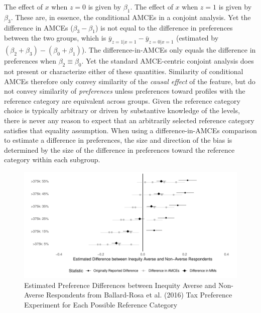 \documentclass[a4paper,12pt]{article}\usepackage[]{graphicx}\usepackage[]{color}
\makeatletter
\def\maxwidth{ %
  \ifdim\Gin@nat@width>\linewidth
    \linewidth
  \else
    \Gin@nat@width
  \fi
}
\newenvironment{knitrout}{}{} %
\makeatother
\begin{document}
\noindent The effect of $x$ when $z=0$ is given by $\beta_1$. The effect of $x$ when $z=1$ is given by $\beta_3$. These are, in essence, the conditional AMCEs in a conjoint analysis. Yet the difference in AMCEs ($\beta_3 - \beta_1$) is not equal to the difference in preferences between the two groups, which is $\bar{y}_{z=1|x=1} - \bar{y}_{z=0|x=1}$ (estimated by $(\beta_2 + \beta_3) - (\beta_0 + \beta_1)$). The difference-in-AMCEs only equals the difference in preferences when $\beta_2 \equiv \beta_0$. Yet the standard AMCE-centric conjoint analysis does not present or characterize either of these quantities. Similarity of conditional AMCEs therefore only convey similarity of the \textit{causal effect} of the feature, but do not convey similarity of \textit{preferences} unless preferences toward profiles with the reference category are equivalent across groups. Given the reference category choice is typically arbitrary or driven by substantive knowledge of the levels, there is never any reason to expect that an arbitrarily selected reference category satisfies that equality assumption. When using a difference-in-AMCEs comparison to estimate a difference in preferences, the size and direction of the bias is determined by the size of the difference in preferences toward the reference category within each subgroup.

\begin{knitrout}
\color{fgcolor}\begin{figure}
\includegraphics[width=\maxwidth]{figure/bms_difference_comparison-1} \caption[Estimated Preference Differences between Inequity Averse and Non-Averse Respondents from Ballard-Rosa et al]{Estimated Preference Differences between Inequity Averse and Non-Averse Respondents from Ballard-Rosa et al. (2016) Tax Preference Experiment for Each Possible Reference Category}\label{fig:bms_difference_comparison}
\end{figure}


\end{knitrout}
\end{document}
